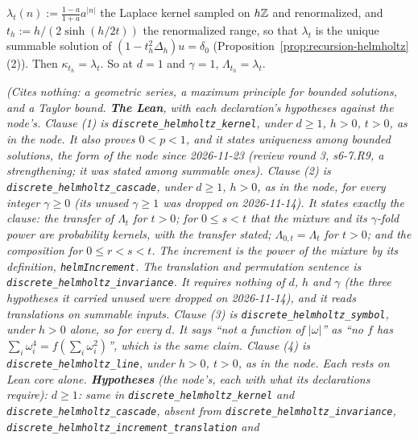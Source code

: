 \begin{proposition}
\begin{enumerate}
$\lambda_t(n) := \tfrac{1-a}{1+a}a^{|n|}$ the Laplace kernel sampled on $h\mathbb{Z}$ and renormalized,
and $t_h := h/(2\sinh(h/2t))$ the renormalized range, so that $\lambda_t$ is the unique summable
solution of $(1 - t_h^2\Delta_h)u = \delta_0$ (Proposition~\ref{prop:recursion-helmholtz}(2)). Then
$\kappa_{t_h} = \lambda_t$. So at $d = 1$ and $\gamma = 1$, $\Lambda_{t_h} = \lambda_t$.
\end{enumerate}
\statusT\quad\emph{(Cites nothing: a geometric series, a maximum principle for bounded solutions,
and a Taylor bound. \textbf{The Lean}, with each declaration's hypotheses against the node's.
Clause (1) is \texttt{discrete\_helmholtz\_kernel}, under $d \ge 1$, $h > 0$, $t > 0$, as in the
node. It also proves $0 < p < 1$, and it states uniqueness among bounded solutions, the form of the
node since 2026-11-23 (review round 3, s6-7.R9, a strengthening; it was stated among summable
ones). Clause (2) is
\texttt{discrete\_helmholtz\_cascade}, under $d \ge 1$, $h > 0$, as in the node, for every integer
$\gamma \ge 0$ (its unused $\gamma \ge 1$ was dropped on 2026-11-14). It
states exactly the clause: the transfer of $\Lambda_t$ for $t > 0$; for $0 \le s < t$ that the
mixture and its $\gamma$-fold power are probability kernels, with the transfer stated;
$\Lambda_{0,t} = \Lambda_t$ for $t > 0$; and the composition for $0 \le r < s < t$. The increment is
the power of the mixture by its definition, \texttt{helmIncrement}. The translation and permutation sentence is
\texttt{discrete\_helmholtz\_invariance}. It requires nothing of $d$, $h$ and $\gamma$ (the three
hypotheses it carried unused were dropped on 2026-11-14), and it reads translations on summable
inputs. Clause (3) is \texttt{discrete\_helmholtz\_symbol}, under
$h > 0$ alone, so for every $d$. It says ``not a function of $|\omega|$'' as ``no $f$ has
$\sum_i\omega_i^4 = f(\sum_i\omega_i^2)$'', which is the same claim. Clause (4) is
\texttt{discrete\_helmholtz\_line}, under $h > 0$, $t > 0$, as in the node. Each rests on Lean core
alone. \textbf{Hypotheses} (the node's, each with what its declarations require): $d \ge 1$: same in
\texttt{discrete\_helmholtz\_kernel} and \texttt{discrete\_helmholtz\_cascade}, absent from
\texttt{discrete\_helmholtz\_invariance}, \texttt{discrete\_helmholtz\_increment\_translation} and
}
\end{proposition}
